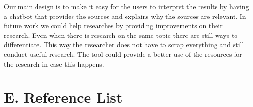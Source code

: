 \documentclass[11pt,a4paper]{article}
\begin{document}
Our main design is to make it easy for the users to interpret the results by having a chatbot that provides the sources and explains why the sources are relevant. In future work we could help researches by providing improvements on their research. Even when there is research on the same topic there are still ways to differentiate. This way the researcher does not have to scrap everything and still conduct useful research. The tool could provide a better use of the resources for the research in case this happens. 


\section*{E. Reference List}
\end{document}
